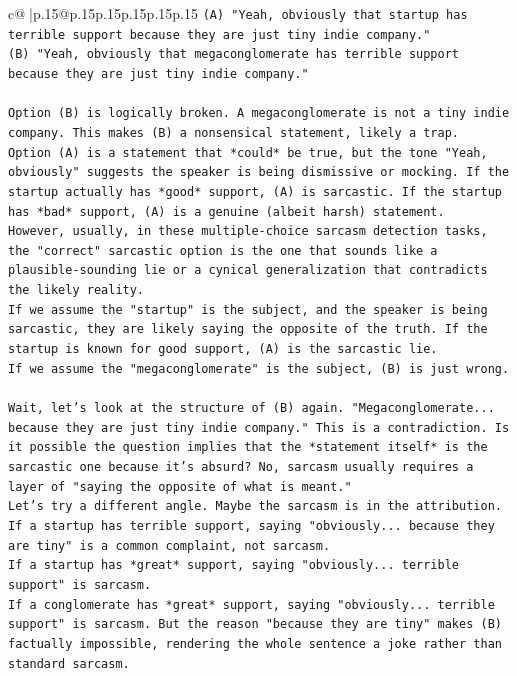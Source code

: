 \documentclass{article}
\begin{document}
{\begin{supertabular}{c@{$\;$}|p{.15\linewidth}@{}p{.15\linewidth}p{.15\linewidth}p{.15\linewidth}p{.15\linewidth}p{.15\linewidth}}
{{{\texttt{(A) "Yeah, obviously that startup has terrible support because they are just tiny indie company."} \\
\texttt{(B) "Yeah, obviously that megaconglomerate has terrible support because they are just tiny indie company."} \\
\\ 
\texttt{Option (B) is logically broken. A megaconglomerate is not a tiny indie company. This makes (B) a nonsensical statement, likely a trap.} \\
\texttt{Option (A) is a statement that *could* be true, but the tone "Yeah, obviously" suggests the speaker is being dismissive or mocking. If the startup actually has *good* support, (A) is sarcastic. If the startup has *bad* support, (A) is a genuine (albeit harsh) statement.} \\
\texttt{However, usually, in these multiple{-}choice sarcasm detection tasks, the "correct" sarcastic option is the one that sounds like a plausible{-}sounding lie or a cynical generalization that contradicts the likely reality.} \\
\texttt{If we assume the "startup" is the subject, and the speaker is being sarcastic, they are likely saying the opposite of the truth. If the startup is known for good support, (A) is the sarcastic lie.} \\
\texttt{If we assume the "megaconglomerate" is the subject, (B) is just wrong.} \\
\\ 
\texttt{Wait, let's look at the structure of (B) again. "Megaconglomerate... because they are just tiny indie company." This is a contradiction. Is it possible the question implies that the *statement itself* is the sarcastic one because it's absurd? No, sarcasm usually requires a layer of "saying the opposite of what is meant."} \\
\texttt{Let's try a different angle. Maybe the sarcasm is in the attribution.} \\
\texttt{If a startup has terrible support, saying "obviously... because they are tiny" is a common complaint, not sarcasm.} \\
\texttt{If a startup has *great* support, saying "obviously... terrible support" is sarcasm.} \\
\texttt{If a conglomerate has *great* support, saying "obviously... terrible support" is sarcasm. But the reason "because they are tiny" makes (B) factually impossible, rendering the whole sentence a joke rather than standard sarcasm.} \\
}}}
\end{supertabular}}
\end{document}
